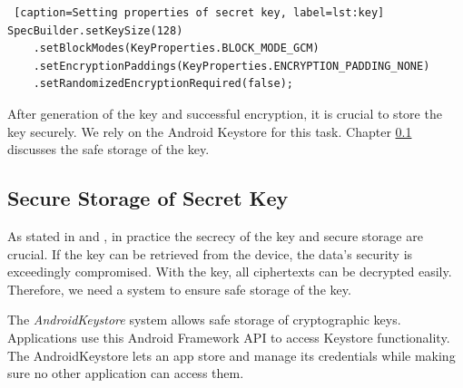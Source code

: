 \begin{lstlisting} [caption=Setting properties of secret key, label=lst:key]
SpecBuilder.setKeySize(128)
    .setBlockModes(KeyProperties.BLOCK_MODE_GCM)
    .setEncryptionPaddings(KeyProperties.ENCRYPTION_PADDING_NONE)
    .setRandomizedEncryptionRequired(false);
\end{lstlisting}

After generation of the key and successful encryption, it is crucial to store the key securely. We rely on the Android Keystore for this task. Chapter \ref{arch_keystore} discusses the safe storage of the key. \\




\subsection{Secure Storage of Secret Key} \label{arch_keystore}
As stated in \cite{dworkin2007sp} and \cite{DBLP:conf/ccs/CooijmansRP14},  in practice the secrecy of the key and secure storage are crucial. If the key can be retrieved from the device, the data's security is exceedingly compromised. With the key, all ciphertexts can be decrypted easily. Therefore, we need a system to ensure safe storage of the key.

The \textit{AndroidKeystore} system allows safe storage of cryptographic keys. Applications use this Android Framework API  to access Keystore functionality. \cite{HWBKeyStore} The AndroidKeystore lets an app store and manage its credentials while making sure no other application can access them. \cite{AndroidKeyStoreSystem}

